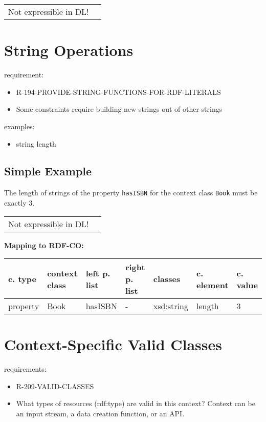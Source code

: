 \documentclass{llncs}
\newcommand{\ms}[1]{\texttt{#1}}
\newenvironment{gcotable}{
  \scriptsize
  \sffamily
  \vspace{0cm}
	\begin{center}
	\textbf{\vspace{0.4cm}Mapping to RDF-CO:} \\
  \begin{tabular}{l|l|l|l|l|l|l}
	\hline
  \textbf{c. type} & \textbf{context class} & \textbf{left p. list} & \textbf{right p. list} & \textbf{classes} & \textbf{c. element} & \textbf{c. value} \\
  \hline

}{
  \hline
  \end{tabular}
	\end{center}
}
\newenvironment{DL}{
  \vspace{0cm}
	\begin{center}
  \begin{tabular}{r l}

}{
  \end{tabular}
	\end{center}
}
\begin{document}
\begin{DL}
Not expressible in DL!
\end{DL}

\section{String Operations}

requirement:

\begin{itemize}
	\item R-194-PROVIDE-STRING-FUNCTIONS-FOR-RDF-LITERALS
\end{itemize}

\begin{itemize}
	\item Some constraints require building new strings out of other strings
\end{itemize}

examples:

\begin{itemize}
	\item string length
\end{itemize}

\subsection{Simple Example}

The length of strings of the property \ms{hasISBN} for the context class \ms{Book} must be exactly 3.

\begin{DL}
Not expressible in DL!
\end{DL}

\begin{gcotable}
property & Book & hasISBN & - & xsd:string & length & 3 \\
\end{gcotable}

\section{Context-Specific Valid Classes}

requirements:

\begin{itemize}
	\item R-209-VALID-CLASSES
\end{itemize}

\begin{itemize}
	\item What types of resources (rdf:type) are valid in this context? Context can be an input stream, a data creation function, or an API.
\end{itemize}
\end{document}
